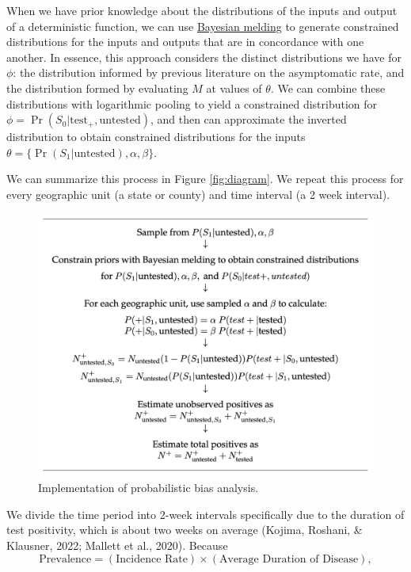 \documentclass[12pt,twoside]{smiththesis}
\begin{document}
When we have prior knowledge about the distributions of the inputs and output of a deterministic function, we can use \protect\hyperlink{meld}{Bayesian melding} to generate constrained distributions for the inputs and outputs that are in concordance with one another. In essence, this approach considers the distinct distributions we have for \(\phi\): the distribution informed by previous literature on the asymptomatic rate, and the distribution formed by evaluating \(M\) at values of \(\theta\). We can combine these distributions with logarithmic pooling to yield a constrained distribution for \(\phi=\Pr(S_0|\text{test}_+, \text{untested})\), and then can approximate the inverted distribution to obtain constrained distributions for the inputs \(\theta = \{\Pr(S_1|\text{untested}), \alpha, \beta \}\).

We can summarize this process in Figure \ref{fig:diagram}. We repeat this process for every geographic unit (a state or county) and time interval (a 2 week interval).
\begin{figure}

{\centering \includegraphics[width=1\linewidth]{./figure/analysis_diagram} 

}

\caption{\label{fig:diagram}Implementation of probabilistic bias analysis.}\label{fig:unnamed-chunk-8}
\end{figure}
We divide the time period into 2-week intervals specifically due to the duration of test positivity, which is about two weeks on average (Kojima, Roshani, \& Klausner, 2022; Mallett et al., 2020). Because
\[ \text{Prevalence} = (\text{Incidence Rate}) \times (\text{Average Duration of Disease}), \]
\end{document}
